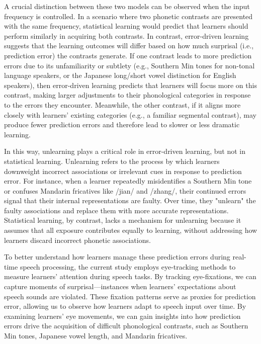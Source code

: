 A crucial distinction between these two models can be observed when the input frequency is controlled. In a scenario where two phonetic contrasts are presented with the same frequency, statistical learning would predict that learners should perform similarly in acquiring both contrasts. In contrast, error-driven learning suggests that the learning outcomes will differ based on how much surprisal (i.e., prediction error) the contrasts generate. If one contrast leads to more prediction errors due to its unfamiliarity or subtlety (e.g., Southern Min tones for non-tonal language speakers, or the Japanese long/short vowel distinction for English speakers), then error-driven learning predicts that learners will focus more on this contrast, making larger adjustments to their phonological categories in response to the errors they encounter. Meanwhile, the other contrast, if it aligns more closely with learners’ existing categories (e.g., a familiar segmental contrast), may produce fewer prediction errors and therefore lead to slower or less dramatic learning.

In this way, unlearning plays a critical role in error-driven learning, but not in statistical learning. Unlearning refers to the process by which learners downweight incorrect associations or irrelevant cues in response to prediction error. For instance, when a learner repeatedly misidentifies a Southern Min tone or confuses Mandarin fricatives like /jian/ and /zhang/, their continued errors signal that their internal representations are faulty. Over time, they "unlearn" the faulty associations and replace them with more accurate representations. Statistical learning, by contrast, lacks a mechanism for unlearning because it assumes that all exposure contributes equally to learning, without addressing how learners discard incorrect phonetic associations.

To better understand how learners manage these prediction errors during real-time speech processing, the current study employs eye-tracking methods to measure learners' attention during speech tasks. By tracking eye-fixations, we can capture moments of surprisal—instances when learners' expectations about speech sounds are violated. These fixation patterns serve as proxies for prediction error, allowing us to observe how learners adapt to speech input over time. By examining learners' eye movements, we can gain insights into how prediction errors drive the acquisition of difficult phonological contrasts, such as Southern Min tones, Japanese vowel length, and Mandarin fricatives.

